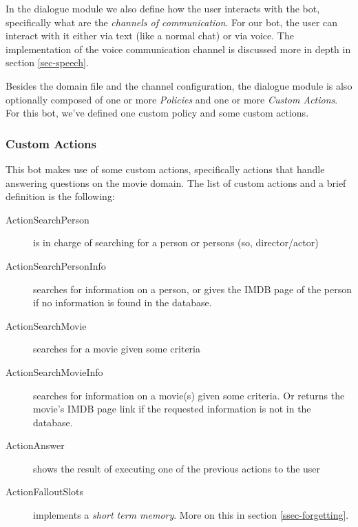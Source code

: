 \documentclass[11pt,a4paper]{article}
\begin{document}
			In the dialogue module we also define how the user interacts with the bot, specifically what are the \textit{channels of communication}. For our bot, the user can interact with it either via text (like a normal chat) or via voice. The implementation of the voice communication channel is discussed more in depth in section \ref{sec-speech}.
			
			Besides the domain file and the channel configuration, the dialogue module is also optionally composed of one or more \textit{Policies} and one or more \textit{Custom Actions}. For this bot, we've defined one custom policy and some custom actions. 
			

		\subsubsection{Custom Actions}
		\label{ssec-custom-actions}	
			
			This bot makes use of some custom actions, specifically actions that handle answering questions on the movie domain. The list of custom actions and a brief definition is the following:
			
			\begin{description}
				\item[ActionSearchPerson] 
				is in charge of searching for a person or persons (so, director/actor)
				
				\item[ActionSearchPersonInfo] 
				searches for information on a person, or gives the IMDB page of the person if no information is found in the database.
				
				\item[ActionSearchMovie] 
				searches for a movie given some criteria
				
				\item[ActionSearchMovieInfo] 
				searches for information on a movie(s) given some criteria. Or returns the movie's IMDB page link if the requested information is not in the database.
				
				\item[ActionAnswer] 
				shows the result of executing one of the previous actions to the user
				
				\item[ActionFalloutSlots] 
				implements a \textit{short term memory}. More on this in section \ref{ssec-forgetting}.
				
				
			\end{description}
			
\end{document}

